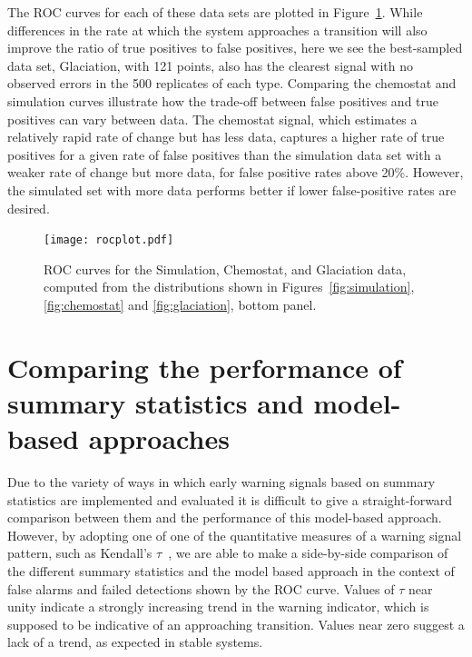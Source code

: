 \documentclass[authoryear,review,11pt]{elsarticle}
\begin{document}
The ROC curves for each of these data sets are plotted in Figure~\ref{fig:rocdata}.  
While differences in the rate at which the system approaches a transition will also 
improve the ratio of true positives to false positives, 
here we see the best-sampled data set, Glaciation, with 121 points, 
also has the clearest signal with no observed errors in the 500 replicates of each type.   
Comparing the chemostat and simulation curves illustrate how the trade-off between
false positives and true positives can vary between data.  The chemostat signal, 
which estimates a relatively rapid rate of change but has less data, captures a higher
rate of true positives for a given rate of false positives than the simulation data
set with a weaker rate of change but more data, for false positive rates above 20\%.  
However, the simulated set with more data performs better if lower false-positive rates
are desired.  



 \begin{figure}
   \begin{center}
     \texttt{[image: rocplot.pdf]}
     \caption{ROC curves for the Simulation, Chemostat, and Glaciation data, computed from the distributions shown in Figures~\ref{fig:simulation}, \ref{fig:chemostat} and \ref{fig:glaciation}, bottom panel.}
     \label{fig:rocdata}
  \end{center}
 \end{figure}


\section{Comparing the performance of summary statistics and model-based approaches}
Due to the variety of ways in which early warning signals based on summary statistics are implemented and evaluated
it is difficult to give a straight-forward comparison between them and the performance of this model-based approach.
However, by adopting one of one of the quantitative measures of a warning signal pattern,
such as Kendall's $\tau$~\citep{Dakos2008, Dakos2011, Dakos2009},
we are able to make a side-by-side comparison of the different summary statistics and the model based approach in the
context of false alarms and failed detections shown by the ROC curve.
Values of $\tau$ near unity indicate a strongly increasing trend in the warning indicator,
which is supposed to be indicative of an approaching transition.
Values near zero suggest a lack of a trend, as expected in stable systems.
\end{document}

